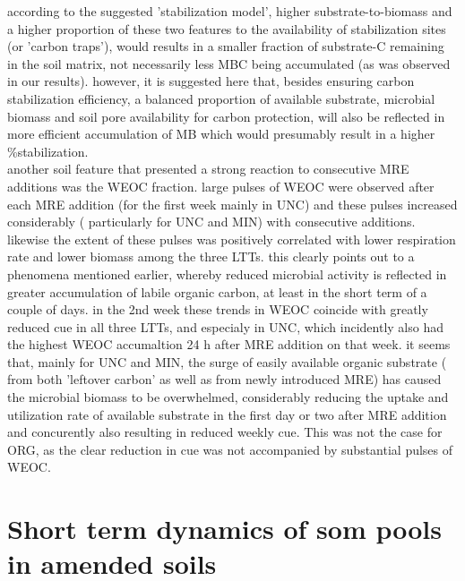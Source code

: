 	 according to the suggested 'stabilization model', higher substrate-to-biomass and a higher proportion of these two features to the availability of stabilization sites (or 'carbon traps'), would results in a smaller fraction of substrate-C remaining in the soil matrix, not necessarily less MBC being accumulated (as was observed in our results). however, it is suggested here that, besides ensuring carbon stabilization efficiency, a balanced proportion of available substrate, microbial biomass and soil pore availability for carbon protection, will also be reflected in more efficient accumulation of MB which would presumably result in a higher \%stabilization.\\
 	 another soil feature that presented a strong reaction to consecutive MRE additions was the WEOC fraction. large pulses of WEOC were observed after each MRE addition (for the first week mainly in UNC) and these pulses increased considerably ( particularly for UNC and MIN) with consecutive additions. likewise the extent of these pulses was positively correlated with lower respiration rate and lower biomass among the three LTTs. this clearly points out to a phenomena mentioned earlier, whereby reduced microbial activity is reflected in greater accumulation of labile organic carbon, at least in the short term of a couple of days. in the 2nd week these trends in WEOC coincide with greatly reduced \gls{cue} in all three LTTs, and especialy in UNC, which incidently also had the highest WEOC accumaltion 24 h after MRE addition on that week. it seems that, mainly for UNC and MIN, the surge of easily available organic substrate ( from both 'leftover carbon' as well as from newly introduced MRE) has caused the microbial biomass to be overwhelmed, considerably reducing the uptake and utilization rate of available substrate in the first day or two after MRE addition and concurently also resulting in reduced weekly \gls{cue}.
	 This was not the case for ORG, as the clear reduction in \gls{cue} was not accompanied by substantial pulses of WEOC.

\section{Short term dynamics of \gls{som} pools in amended soils}

